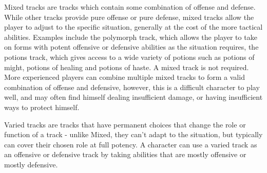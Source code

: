 \begin{multicols*}{2}
Mixed tracks are tracks which contain some combination of offense and defense. While other tracks provide pure offense or pure defense, mixed tracks allow the player to adjust to the specific situation, generally at the cost of the more tactical abilities. Examples include the polymorph track, which allows the player to take on forms with potent offensive or defensive abilities as the situation requires, the potions track, which gives access to a wide variety of potions such as potions of might, potions of healing and potions of haste. A mixed track is not required. More experienced players can combine multiple mixed tracks to form a valid combination of offense and defensive, however, this is a difficult character to play well, and may often find himself dealing insufficient damage, or having insufficient ways to protect himself.

Varied tracks are tracks that have permanent choices that change the role or function of a track - unlike Mixed, they can’t adapt to the situation, but typically can cover their chosen role at full potency. A character can use a varied track as an offensive or defensive track by taking abilities that are mostly offensive or mostly defensive.

\end{multicols*}
